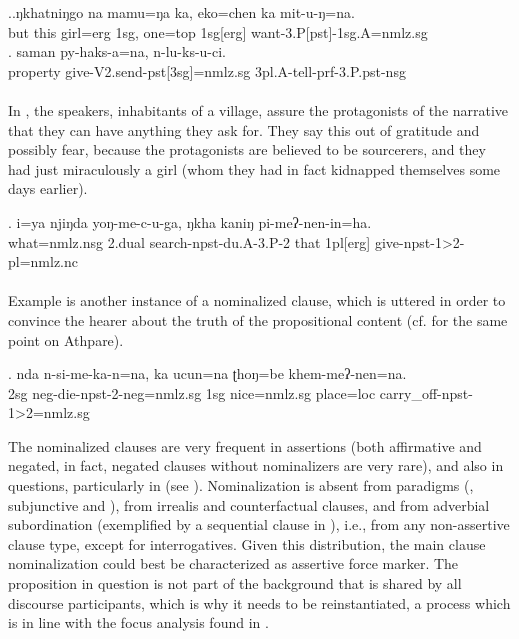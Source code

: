 
\ex.\ag.ŋkhatniŋgo na  mamu=ŋa   ka, eko=chen ka mit-u-ŋ=na.\\ 
	 but  this girl{\sc =erg}  {\sc 1sg}, one{\sc =top} {\sc 1sg[erg]} want{\sc -3.P[pst]-1sg.A=nmlz.sg}\\
\bg. saman   py-haks-a=na,  n-lu-ks-u-ci.\\
property give-V2.send{\sc -pst[3sg]=nmlz.sg} {\sc 3pl.A}-tell{\sc -prf-3.P.pst-nsg}\\
  \\


In \Next, the speakers, inhabitants of a village, assure the protagonists of the narrative that they can have anything they ask for. They say this out of gratitude and possibly fear, because the protagonists are believed to be sourcerers, and they had just miraculously  a girl (whom they had in fact kidnapped themselves some days earlier). 


\exg.  i=ya  njiŋda yoŋ-me-c-u-ga, ŋkha kaniŋ  pi-meʔ-nen-in=ha.\\
what{\sc =nmlz.nsg} {\sc 2.dual} search{\sc -npst-du.A-3.P-2} that {\sc 1pl[erg]}	give-{\sc npst-1>2-pl=nmlz.nc}\\
	 \\
	

Example \Next is another instance of a nominalized clause, which is uttered in order to convince the hearer about the truth of the propositional content (cf. \citet{Ebert1997A-grammar} for the same point on Athpare). 


\exg. nda n-si-me-ka-n=na,  ka ucun=na  ʈhoŋ=be khem-meʔ-nen=na.\\
		{\sc 2sg} {\sc neg}-die-{\sc npst-2-neg=nmlz.sg} {\sc 1sg}  nice{\sc =nmlz.sg} place{\sc =loc} carry\_off-{\sc npst-1>2=nmlz.sg}\\
	 
\newpage


The nominalized clauses are very frequent in assertions (both affirmative and negated, in fact, negated clauses without nominalizers are very rare), and also in  questions, particularly in  (see \Next[a]). Nominalization is absent from    paradigms (, subjunctive and ), from irrealis and counterfactual clauses, and from adverbial subordination (exemplified by a sequential clause in \Next[b]), i.e., from any non-assertive clause type, except for interrogatives. Given this distribution, the main clause nominalization could best be characterized as assertive force marker. The proposition in question is not part of the background that is shared by all discourse participants, which is why it needs to be reinstantiated, a process which is in line with the focus analysis found in \citet{Bickel1999Nominalization}. 


